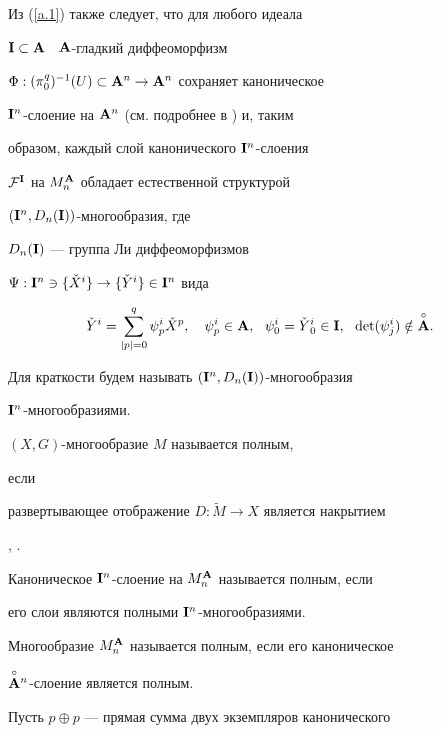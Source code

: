  


Из (\ref{a.1}) также следует, что для любого идеала


${\bold I}\subset{\bold A}$ \ ${\bold A}$-гладкий диффеоморфизм


$\Phi:({\pi^q_0})^{-1}(U)\subset{\bold A}^n\to{\bold A}^n$ сохраняет каноническое


${\bold I}^n$-слоение на ${\bold A}^n$ (см. подробнее в \cite{VSh3}) и, таким


образом, каждый слой канонического ${\bold I}^n$-слоения


${\cal F}^{\bold I}$ на $M^{\bold A}_n$ обладает естественной структурой


$({\bold I}^n,D_n({\bold I}))$-многообразия, где


$D_n({\bold I})$ --- группа Ли диффеоморфизмов


$\Psi:\I^n\ni\{{\check X}{}^i\}\to


\{{\check Y}{}^i\}\in\I^n$ вида


\begin{equation}


\label{k.3}


{\check Y}{}^i=


\sum^q_{|p|=0}\psi^i_p{\check X}{}^p, \quad


\psi^i_p\in\A,\ \ \psi^i_0={\check Y}{}^i_0\in\I,


\ \ \det(\psi^i_j)\notin\Ao.


\end{equation}


Для краткости будем называть $({\bold I}^n,D_n({\bold I}))$-многообразия


${\bold I}^n$-многообразиями.


 


$(X,G)$-многообразие $M$ называется полным,


если


развертывающее отображение $D:\widetilde M\to X$ является накрытием


\cite{Thur}, \cite{Apan}.


Каноническое ${\bold I}^n$-слоение на $M^{\bold A}_n$ называется полным, если


его слои являются полными ${\bold I}^n$-многообразиями.


Многообразие $M^{\bold A}_n$ называется полным, если его каноническое


$\overset{\circ}{{\bold A}}{}^n$-слоение является полным.


 


Пусть $p\oplus p$ --- прямая сумма двух экземпляров канонического


